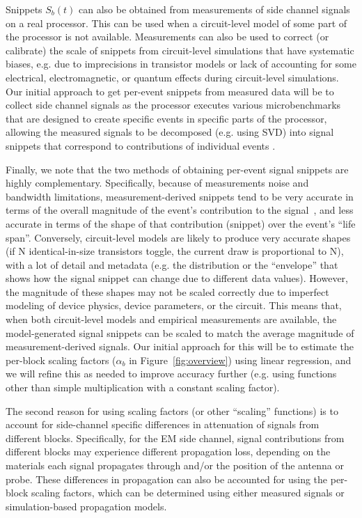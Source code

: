 Snippets $S_b(t)$ can also be obtained from measurements of side channel signals on a real processor. This can be used when a circuit-level model of some part of the processor is not available. Measurements can also be used to correct (or calibrate) the scale of snippets from circuit-level simulations that have systematic biases, e.g. due to imprecisions in transistor models or lack of accounting for some electrical, electromagnetic, or quantum effects during circuit-level simulations.
Our initial approach to get per-event snippets from measured data will be to collect side channel signals as the processor executes various microbenchmarks that are designed to create specific events in specific parts of the processor, allowing the measured signals to be decomposed (e.g. using SVD) into signal snippets that correspond to contributions of individual events .

Finally, we note that the two methods of obtaining per-event signal snippets are highly complementary. Specifically, because of measurements noise and bandwidth limitations, measurement-derived snippets tend to be very accurate in terms of the overall magnitude of the event's contribution to the signal~\cite{Callan:2014:PMM:2742155.2742179}, and less accurate in terms of the shape of that contribution (snippet) over the event's ``life span''. Conversely, circuit-level models are likely to produce very accurate shapes (if N identical-in-size transistors toggle, the current draw is proportional to N), with a lot of detail and metadata (e.g. the distribution or the ``envelope'' that shows how the signal snippet can change due to different data values). However, the magnitude of these shapes may not be scaled correctly due to imperfect modeling of device physics, device parameters, or the circuit. This means that, when both circuit-level models and empirical measurements are available, the model-generated signal snippets can be scaled to match the average magnitude of measurement-derived signals. Our initial approach for this will be to estimate the per-block scaling factors ($\alpha_b$ in Figure~\ref{fig:overview}) using linear regression, and we will refine this as needed to improve accuracy further (e.g. using functions other than simple multiplication with a constant scaling factor).

The second reason for using scaling factors (or other ``scaling'' functions) is to account for side-channel specific differences in attenuation of signals from different blocks. Specifically, for the EM side channel, signal contributions from different blocks may experience different propagation loss, depending on the materials each signal propagates through and/or the position of the antenna or probe. These differences in propagation can also be accounted for using the per-block scaling factors, which can be determined using either measured signals or simulation-based propagation models.

